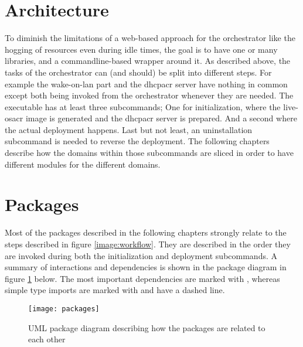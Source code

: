 \section{Architecture}
To diminish the limitations of a web-based approach for the orchestrator like the hogging of resources even during idle times, the goal is to have one or many libraries, and a commandline-based wrapper around it.
\newline
As described above, the tasks of the orchestrator can (and should) be split into different steps. For example the wake-on-lan part and the \gls{dhcpacr} server have nothing in common except both being invoked from the orchestrator whenever they are needed.
\newline
The executable has at least three subcommands; One for initialization, where the live-\gls{osacr} image is generated and the \gls{dhcpacr} server is prepared. And a second where the actual deployment happens. Last but not least, an uninstallation subcommand is needed to reverse the deployment.
\newline
The following chapters describe how the domains within those subcommands are sliced in order to have different modules for the different domains.

\section{Packages}
Most of the packages described in the following chapters strongly relate to the steps described in figure \ref{image:workflow}. They are described in the order they are invoked during both the initialization and deployment subcommands. A summary of interactions and dependencies is shown in the package diagram in figure \ref{image:packages} below. The most important dependencies are marked with , whereas simple type imports are marked with  and have a dashed line.

\begin{figure}[H]
  \texttt{[image: packages]}
  \centering
  \caption{UML package diagram describing how the packages are related to each other}
  \label{image:packages}
\end{figure}

